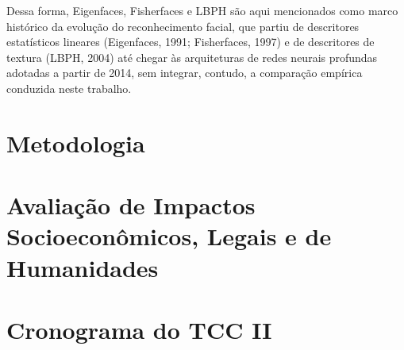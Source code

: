 \documentclass[
    12pt,
    openright,
    twoside,
    a4paper,
    chapter=TITLE,
    section=TITLE,
    english,
    brazil
    ]{abntex2}
\begin{document}
Dessa forma, Eigenfaces, Fisherfaces e LBPH são aqui mencionados como marco
histórico da evolução do reconhecimento facial, que partiu de descritores
estatísticos lineares (Eigenfaces, 1991; Fisherfaces, 1997) e de descritores
de textura (LBPH, 2004) até chegar às arquiteturas de redes neurais
profundas adotadas a partir de 2014, sem integrar, contudo, a comparação
empírica conduzida neste trabalho.

\chapter{Metodologia}

\chapter{Avaliação de Impactos Socioeconômicos, Legais e de Humanidades}

\chapter{Cronograma do TCC II}

\postextual


\end{document}
